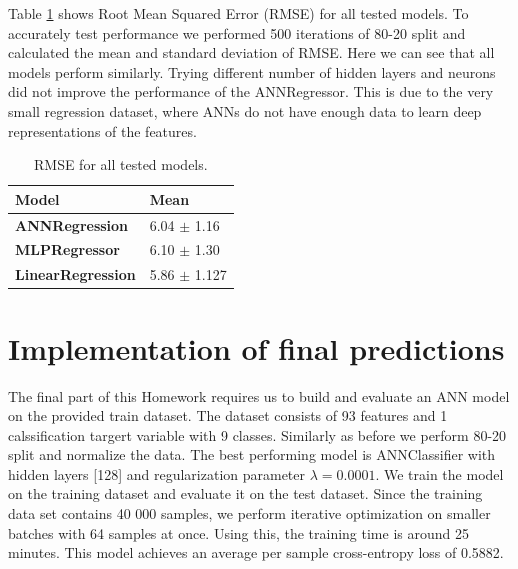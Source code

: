 \documentclass[9pt]{IEEEtran}
\begin{document}
Table \ref{regression_scores} shows Root Mean Squared Error (RMSE) for all tested models.
To accurately test performance we performed 500 iterations of 80-20 split and calculated the mean and standard deviation of RMSE.
Here we can see that all models perform similarly.
Trying different number of hidden layers and neurons did not improve the performance of the ANNRegressor.
This is due to the very small regression dataset, where ANNs do not have enough data to learn deep representations of the features.
\begin{table}[!h]
    \centering
    \begin{tabular}{ll}
        \textbf{Model} & \textbf{Mean} \\ \hline
        \textbf{ANNRegression} & 6.04 $\pm$ 1.16 \\ 
        \textbf{MLPRegressor} & 6.10 $\pm$ 1.30 \\ 
        \textbf{LinearRegression} & 5.86 $\pm$ 1.127  \\ 
    \end{tabular}
    \caption{RMSE for all tested models.}
    \label{regression_scores}
\end{table}



\section{Implementation of final predictions}
The final part of this Homework requires us to build and evaluate an ANN model on the provided train dataset.
The dataset consists of 93 features and 1 calssification targert variable with 9 classes.
Similarly as before we perform 80-20 split and normalize the data.
The best performing model is ANNClassifier with hidden layers [128] and regularization parameter $\lambda = 0.0001$.
We train the model on the training dataset and evaluate it on the test dataset.
Since the training data set contains 40 000 samples, we perform iterative optimization on smaller batches with 64 samples at once.
Using this, the training time is around 25 minutes.
This model achieves an average per sample cross-entropy loss of 0.5882.





\end{document}
